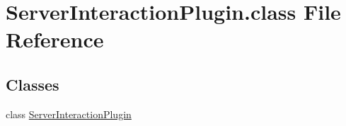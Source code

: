 \hypertarget{ServerInteractionPlugin_8class}{\section{Server\-Interaction\-Plugin.\-class File Reference}
\label{ServerInteractionPlugin_8class}
}
\subsection*{Classes}
\begin{DoxyCompactItemize}
\item 
class \hyperlink{classServerInteractionPlugin}{Server\-Interaction\-Plugin}
\end{DoxyCompactItemize}
